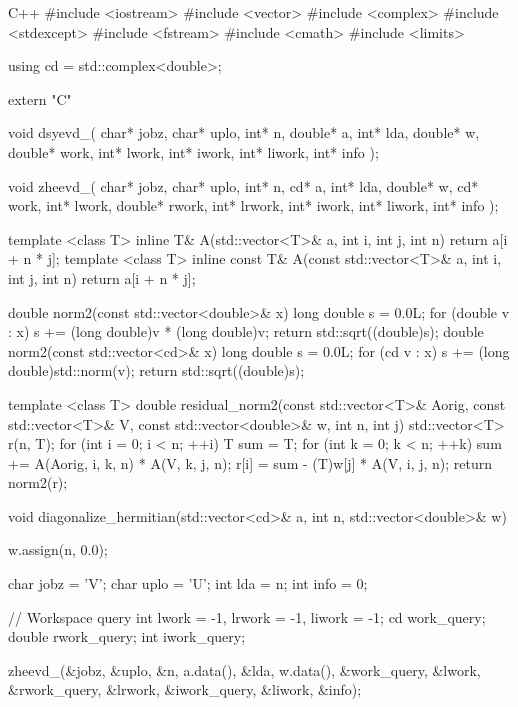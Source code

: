 \documentclass[12pt]{jreport}
\begin{document}
\begin{codebox}{C++}
#include <iostream>
#include <vector>
#include <complex>
#include <stdexcept>
#include <fstream>
#include <cmath>
#include <limits>

using cd = std::complex<double>;

extern "C" {

void dsyevd_(
    char* jobz, char* uplo,
    int* n,
    double* a, int* lda,
    double* w,
    double* work, int* lwork,
    int* iwork, int* liwork,
    int* info
);

void zheevd_(
    char* jobz, char* uplo,
    int* n,
    cd* a, int* lda,
    double* w,
    cd* work, int* lwork,
    double* rwork, int* lrwork,
    int* iwork, int* liwork,
    int* info
);

}

template <class T>
inline T& A(std::vector<T>& a, int i, int j, int n) {
    return a[i + n * j];
}
template <class T>
inline const T& A(const std::vector<T>& a, int i, int j, int n) {
    return a[i + n * j];
}

double norm2(const std::vector<double>& x) {
    long double s = 0.0L;
    for (double v : x) s += (long double)v * (long double)v;
    return std::sqrt((double)s);
}
double norm2(const std::vector<cd>& x) {
    long double s = 0.0L;
    for (cd v : x) s += (long double)std::norm(v);
    return std::sqrt((double)s);
}

template <class T>
double residual_norm2(const std::vector<T>& Aorig,
                      const std::vector<T>& V,
                      const std::vector<double>& w,
                      int n, int j) {
    std::vector<T> r(n, T{});
    for (int i = 0; i < n; ++i) {
        T sum = T{};
        for (int k = 0; k < n; ++k) {
            sum += A(Aorig, i, k, n) * A(V, k, j, n);
        }
        r[i] = sum - (T)w[j] * A(V, i, j, n);
    }
    return norm2(r);
}

void diagonalize_hermitian(std::vector<cd>& a, int n, std::vector<double>& w) {
    w.assign(n, 0.0);

    char jobz = 'V';
    char uplo = 'U';
    int lda = n;
    int info = 0;

    // Workspace query
    int lwork = -1, lrwork = -1, liwork = -1;
    cd work_query;
    double rwork_query;
    int iwork_query;

    zheevd_(&jobz, &uplo, &n,
            a.data(), &lda,
            w.data(),
            &work_query, &lwork,
            &rwork_query, &lrwork,
            &iwork_query, &liwork,
            &info);

}
\end{codebox}
\end{document}
